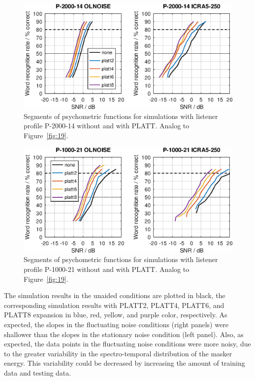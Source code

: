 \documentclass[10pt,a4paper,twocolumn]{article}
\begin{document}
\begin{figure}
	\centerline{\includegraphics[width=\columnwidth]{images/psyfun-P-2000-14}}
	\caption{Segments of psychometric functions for simulations with listener profile P-2000-14 without and with PLATT. Analog to Figure~\ref{fig:19}.}
	\label{fig:20}
\end{figure}
%
\begin{figure}
	\centerline{\includegraphics[width=\columnwidth]{images/psyfun-P-1000-21}}
	\caption{Segments of psychometric functions for simulations with listener profile P-1000-21 without and with PLATT. Analog to Figure~\ref{fig:19}.}
	\label{fig:21}
\end{figure}
%
The simulation results in the unaided conditions are plotted in black, the corresponding simulation results with PLATT2, PLATT4, PLATT6, and PLATT8 expansion in blue, red, yellow, and purple color, respectively.
%
As expected, the slopes in the fluctuating noise conditions (right panels) were shallower than the slopes in the stationary noise condition (left panel).
%
Also, as expected, the data points in the fluctuating noise conditions were more noisy, due to the greater variability in the spectro-temporal distribution of the masker energy.
%
This variability could be decreased by increasing the amount of training data and testing data.
\end{document}
